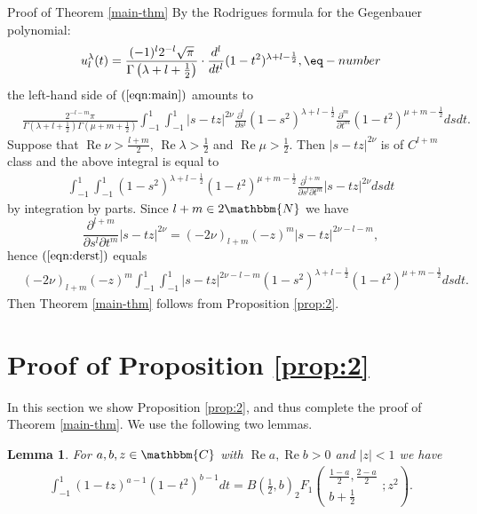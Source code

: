 \documentclass{svjour3}
\newcommand{\tmop}[1]{\ensuremath{\operatorname{#1}}}
\newenvironment{proof*}[1]{\noindent\textbf{#1\ }}{\hspace*{\fill}$\Box$\medskip}
\newtheorem{lemma}{Lemma}
\begin{document}
\begin{proof*}{Proof of Theorem \ref{main-thm}}
  By the Rodrigues formula for the Gegenbauer polynomial:
  \[ u_l^{\lambda} (t) = \frac{(- 1)^l 2^{- l} \sqrt{\pi}}{\Gamma \left(
     \lambda + l + \frac{1}{2} \right)} \cdot \frac{d^l}{d t^l} (1 -
     t^2)^{\lambda + l - \frac{1}{2}}, \eq-number \label{eqn:Rod} \]
  the left-hand side of $(\ref{eqn:main})$ amounts to
  \begin{eqnarray}
    & \frac{2^{- l - m} \pi}{\Gamma \left( \lambda + l + \frac{1}{2} \right)
    \Gamma \left( \mu + m + \frac{1}{2} \right)} \int_{- 1}^1 \int_{- 1}^1 | s
    - t z |^{2 \nu} \frac{\partial^l}{\partial s^l} (1 - s^2)^{\lambda + l -
    \frac{1}{2}} \frac{\partial^m}{\partial t^m} (1 - t^2)^{\mu + m -
    \frac{1}{2}} d s d t. &  \nonumber
  \end{eqnarray}
  Suppose that $\tmop{Re} \nu > \frac{l + m}{2}$, $\tmop{Re} \lambda >
  \frac{1}{2}$ and $\tmop{Re} \mu > \frac{1}{2}$. Then $| s - t z |^{2 \nu}$
  is of $C^{l + m}$ class and the above integral is equal to
  \begin{eqnarray}
    & \int_{- 1}^1 \int_{- 1}^1 (1 - s^2)^{\lambda + l - \frac{1}{2}} (1 -
    t^2)^{\mu + m - \frac{1}{2}} \frac{\partial^{l + m}}{\partial s^l \partial
    t^m} | s - t z |^{2 \nu} d s d t  \label{eqn:derst} & 
  \end{eqnarray}
  by integration by parts. Since $l + m \in 2\mathbbm{N}$ we have
  \[ \frac{\partial^{l + m}}{\partial s^l \partial t^m} | s - t z |^{2 \nu} =
     (- 2 \nu)_{l + m} (- z)^m | s - t z |^{2 \nu - l - m}, \]
  hence $(\ref{eqn:derst})$ equals
  \begin{eqnarray}
    & (- 2 \nu)_{l + m} (- z)^m \int_{- 1}^1 \int_{- 1}^1 | s - t z |^{2 \nu
    - l - m} (1 - s^2)^{\lambda + l - \frac{1}{2}} (1 - t^2)^{\mu + m -
    \frac{1}{2}} d s d t. &  \nonumber
  \end{eqnarray}
  Then Theorem \ref{main-thm} follows from Proposition \ref{prop:2}.
\end{proof*}

\section{Proof of Proposition \ref{prop:2}}\label{sec:3}

In this section we show Proposition \ref{prop:2}, and thus complete the proof
of Theorem \ref{main-thm}. We use the following two lemmas.

\begin{lemma}
  \label{lem4}For $a, b, z \in \mathbbm{C}$ with $\tmop{Re} a, \tmop{Re} b >
  0$ and $| z | < 1$ we have
  \begin{eqnarray}
    & \int_{- 1}^1 (1 - t z)^{a - 1} (1 - t^2)^{b - 1} d t = B \left(
    \frac{1}{2}, b \right) _2 F_1 \left( \begin{array}{c}
      \frac{1 - a}{2}, \frac{2 - a}{2}\\
      b + \frac{1}{2}
    \end{array} ; z^2 \right) . &  \nonumber
  \end{eqnarray}
\end{lemma}
\end{document}
